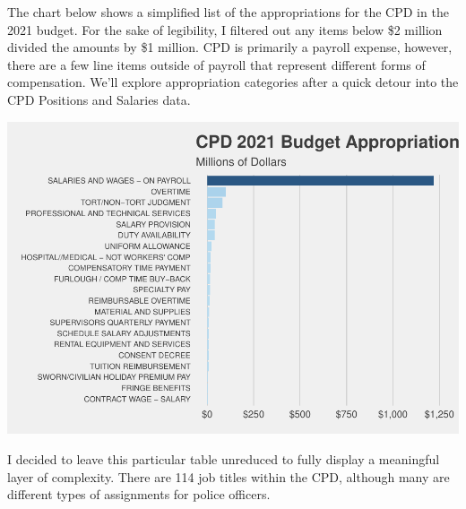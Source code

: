 \documentclass[
]{article}
\begin{document}
\setlength{\parindent}{5ex}

The chart below shows a simplified list of the appropriations for the
CPD in the 2021 budget. For the sake of legibility, I filtered out any
items below \$2 million divided the amounts by \$1 million. CPD is
primarily a payroll expense, however, there are a few line items outside
of payroll that represent different forms of compensation. We'll explore
appropriation categories after a quick detour into the CPD Positions and
Salaries data.

\begin{center}\includegraphics{cpd_budget_analysis_files/figure-latex/CPD appropriations by expense type-1} \end{center}

I decided to leave this particular table unreduced to fully display a
meaningful layer of complexity. There are 114 job titles within the CPD,
although many are different types of assignments for police officers.
\end{document}
